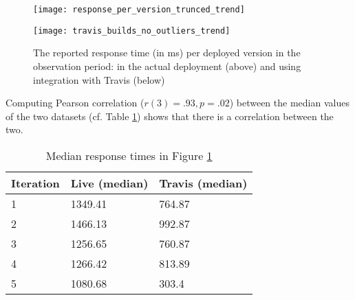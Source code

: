       \begin{figure}[h!]
        \centering
        \texttt{[image: response\_per\_version\_trunced\_trend]}


        \advance\leftskip-0.2cm
        \texttt{[image: travis\_builds\_no\_outliers\_trend]}
        \caption{The reported response time (in ms) per deployed version in the observation period: 
        in the actual deployment (above) and using integration with Travis (below)}        
        
        \label{fig:response_times_preemptive}
      \end{figure}

  Computing Pearson correlation ($r(3)=.93, p=.02$) between the median values of the two datasets (cf. Table \ref{tab:correlations}) shows that there is a correlation between the two.


    \begin{table}[h]
      
      \centering
      \begin{tabular}{lll}
        \toprule
        Iteration & \bfseries Live (median) & \bfseries Travis (median)\\
        \midrule
        1 & 1349.41 & 764.87\\ 
        2 & 1466.13 & 992.87\\
        3 & 1256.65 & 760.87\\
        4 & 1266.42 & 813.89\\
        5 & 1080.68 & 303.4\\
        \bottomrule
      
      \end{tabular}
      \caption{Median response times in Figure \ref{fig:response_times_preemptive}}
      \label{tab:correlations}
    \end{table}





